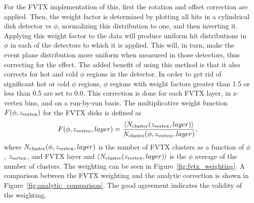 For the FVTX implementation of this, first the rotation and offset correction are applied. Then, the weight factor is determined by plotting all hits in a cylindrical disk detector vs $\phi$, normalizing this distribution to one, and then inverting it. Applying this weight factor to the data will produce uniform hit distributions in $\phi$ in each of the detectors to which it is applied. This will, in turn, make the event plane distribution more uniform when measured in those detectors, thus correcting for the effect. The added benefit of using this method is that it also corrects for hot and cold $\phi$ regions in the detector. In order to get rid of significant hot or cold $\phi$ regions, $\phi$ regions with weight factors greater than 1.5 or less than 0.5 are set to 0.0. This correction is done for each FVTX layer, in z-vertex bins, and on a run-by-run basis. The multiplicative weight function $F(\phi,z_{\rm vertex})$ for the FVTX disks is defined as 
\begin{equation}
F(\phi,z_{\rm vertex},layer) = \frac{\left<N_{\rm cluster}(z_{\rm vertex},layer)\right>}{N_{\rm cluster}(\phi,z_{\rm vertex},layer)},
\end{equation}
where $N_{\rm cluster}(\phi,z_{\rm vertex},layer)$ is the number of FVTX clusters as a function of $\phi$, $z_{\rm vertex}$, and FVTX layer and $\left<N_{\rm cluster}(z_{\rm vertex},layer)\right>$ is the $\phi$ average of the number of clusters. The weighting can be seen in Figure~\ref{fig:fvtx_weighting}. A comparison between the FVTX weighting and the analytic correction is shown in Figure~\ref{fig:analytic_comparison}. The good agreement indicates the validity of the weighting.

